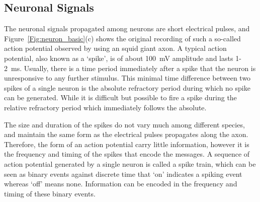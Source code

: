 %


\subsection{Neuronal Signals}
The neuronal signals propagated among neurons are short electrical pulses, and Figure~\ref{Fig:neuron_basic}(c) shows the original recording of such a so-called action potential observed by using an squid giant axon.
A typical action potential, also known as a `spike', is of about 100~mV amplitude and lasts 1-2~ms.
Usually, there is a time period immediately after a spike that the neuron is unresponsive to any further stimulus.
This minimal time difference between two spikes of a single neuron is the absolute refractory period during which no spike can be generated.
While it is difficult but possible to fire a spike during the relative refractory period which immediately follows the absolute.

The size and duration of the spikes do not vary much among different species, and maintain the same form as the electrical pulses propagates along the axon.
Therefore, the form of an action potential carry little information, however it is the frequency and timing of the spikes that encode the messages.
A sequence of action potential generated by a single neuron is called a spike train, which can be seen as binary events against discrete time that `on' indicates a spiking event whereas `off' means none.
Information can be encoded in the frequency and timing of these binary events.


